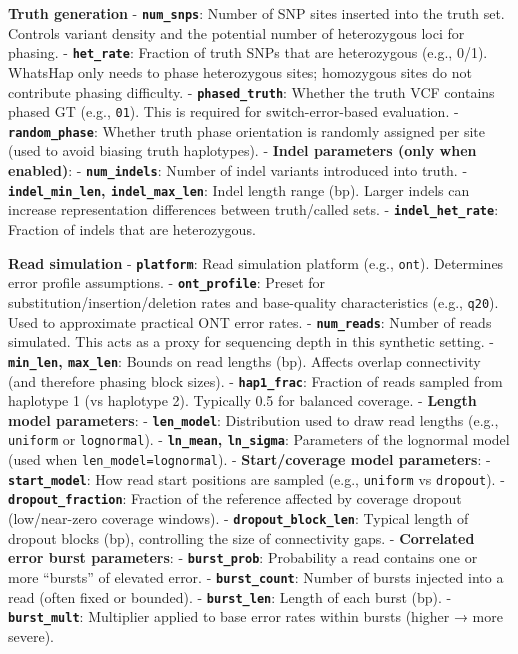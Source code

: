 \documentclass[
]{article}
\begin{document}
\textbf{Truth generation} - \textbf{\texttt{num\_snps}}: Number of SNP
sites inserted into the truth set. Controls variant density and the
potential number of heterozygous loci for phasing. -
\textbf{\texttt{het\_rate}}: Fraction of truth SNPs that are
heterozygous (e.g., 0/1). WhatsHap only needs to phase heterozygous
sites; homozygous sites do not contribute phasing difficulty. -
\textbf{\texttt{phased\_truth}}: Whether the truth VCF contains phased
GT (e.g., \texttt{0\textbar{}1}). This is required for
switch-error-based evaluation. - \textbf{\texttt{random\_phase}}:
Whether truth phase orientation is randomly assigned per site (used to
avoid biasing truth haplotypes). - \textbf{Indel parameters (only when
enabled)}: - \textbf{\texttt{num\_indels}}: Number of indel variants
introduced into truth. - \textbf{\texttt{indel\_min\_len},
\texttt{indel\_max\_len}}: Indel length range (bp). Larger indels can
increase representation differences between truth/called sets. -
\textbf{\texttt{indel\_het\_rate}}: Fraction of indels that are
heterozygous.

\textbf{Read simulation} - \textbf{\texttt{platform}}: Read simulation
platform (e.g., \texttt{ont}). Determines error profile assumptions. -
\textbf{\texttt{ont\_profile}}: Preset for
substitution/insertion/deletion rates and base-quality characteristics
(e.g., \texttt{q20}). Used to approximate practical ONT error rates. -
\textbf{\texttt{num\_reads}}: Number of reads simulated. This acts as a
proxy for sequencing depth in this synthetic setting. -
\textbf{\texttt{min\_len}, \texttt{max\_len}}: Bounds on read lengths
(bp). Affects overlap connectivity (and therefore phasing block sizes).
- \textbf{\texttt{hap1\_frac}}: Fraction of reads sampled from haplotype
1 (vs haplotype 2). Typically 0.5 for balanced coverage. -
\textbf{Length model parameters}: - \textbf{\texttt{len\_model}}:
Distribution used to draw read lengths (e.g., \texttt{uniform} or
\texttt{lognormal}). - \textbf{\texttt{ln\_mean}, \texttt{ln\_sigma}}:
Parameters of the lognormal model (used when
\texttt{len\_model=lognormal}). - \textbf{Start/coverage model
parameters}: - \textbf{\texttt{start\_model}}: How read start positions
are sampled (e.g., \texttt{uniform} vs \texttt{dropout}). -
\textbf{\texttt{dropout\_fraction}}: Fraction of the reference affected
by coverage dropout (low/near-zero coverage windows). -
\textbf{\texttt{dropout\_block\_len}}: Typical length of dropout blocks
(bp), controlling the size of connectivity gaps. - \textbf{Correlated
error burst parameters}: - \textbf{\texttt{burst\_prob}}: Probability a
read contains one or more ``bursts'' of elevated error. -
\textbf{\texttt{burst\_count}}: Number of bursts injected into a read
(often fixed or bounded). - \textbf{\texttt{burst\_len}}: Length of each
burst (bp). - \textbf{\texttt{burst\_mult}}: Multiplier applied to base
error rates within bursts (higher → more severe).
\end{document}
